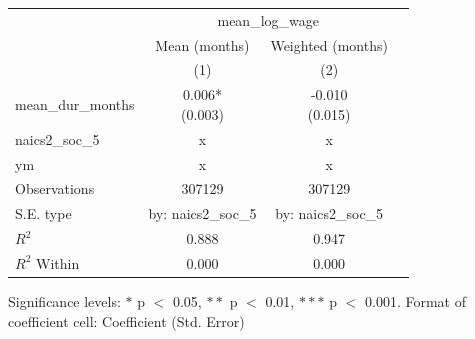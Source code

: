 \renewcommand\cellalign{t}
\begin{threeparttable}
\begin{tabular}{lccc}
\toprule
 & \multicolumn{2}{c}{mean_log_wage} \\
\cmidrule(lr){2-3} 
 & Mean (months) & Weighted (months) \\
 & (1) & (2) \\
\midrule
\addlinespace
mean_dur_months & \makecell{0.006* \\ (0.003)} & \makecell{-0.010 \\ (0.015)} \\
\midrule
\addlinespace
naics2_soc_5 & x & x \\
ym & x & x \\
\midrule
\addlinespace
Observations & 307129 & 307129 \\
S.E. type & by: naics2_soc_5 & by: naics2_soc_5 \\
$R^2$ & 0.888 & 0.947 \\
$R^2$ Within & 0.000 & 0.000 \\
\bottomrule
\end{tabular}
\footnotesize Significance levels: $*$ p $<$ 0.05, $**$ p $<$ 0.01, $***$ p $<$ 0.001. Format of coefficient cell: Coefficient 
 (Std. Error)
\end{threeparttable}